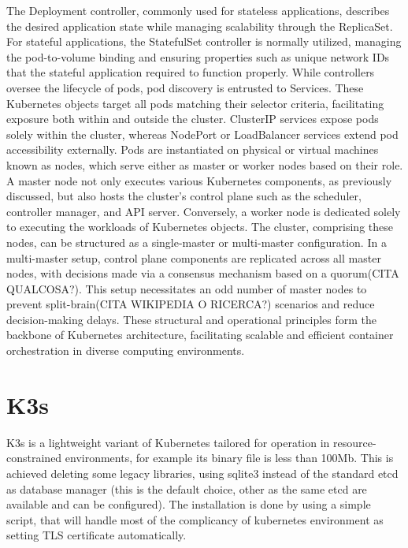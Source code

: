 The Deployment controller, commonly used for stateless applications, describes the desired application state while managing scalability through the ReplicaSet. For stateful applications, the StatefulSet controller is normally utilized, managing the pod-to-volume binding and ensuring properties such as unique network IDs that the stateful application required to function properly.
While controllers oversee the lifecycle of pods, pod discovery is entrusted to Services. These Kubernetes objects target all pods matching their selector criteria, facilitating exposure both within and outside the cluster. ClusterIP services expose pods solely within the cluster, whereas NodePort or LoadBalancer services extend pod accessibility externally.
Pods are instantiated on physical or virtual machines known as nodes, which serve either as master or worker nodes based on their role. A master node not only executes various Kubernetes components, as previously discussed, but also hosts the cluster's control plane such as the scheduler, controller manager, and API server. Conversely, a worker node is dedicated solely to executing the workloads of Kubernetes objects.
The cluster, comprising these nodes, can be structured as a single-master or multi-master configuration. In a multi-master setup, control plane components are replicated across all master nodes, with decisions made via a consensus mechanism based on a quorum(CITA QUALCOSA?). This setup necessitates an odd number of master nodes to prevent split-brain(CITA WIKIPEDIA O RICERCA?) scenarios and reduce decision-making delays. These structural and operational principles form the backbone of Kubernetes architecture, facilitating scalable and efficient container orchestration in diverse computing environments.

\section{K3s}
K3s is a lightweight variant of Kubernetes tailored for operation in resource-constrained environments, for example its binary file is less than 100Mb. This is achieved deleting some legacy libraries, using sqlite3 instead of the standard etcd as database manager (this is the default choice, other as the same etcd are available and can be configured). The installation is done by using a simple script, that will handle most of the complicancy of kubernetes environment as setting TLS certificate automatically.


